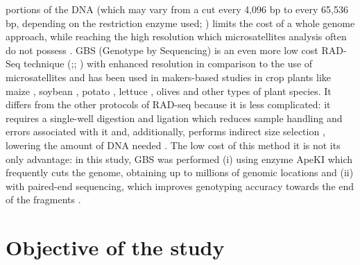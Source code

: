 \documentclass[a4paper, 12pt]{report}
\begin{document}
portions of the DNA (which may vary from a cut every 4,096 bp to every 65,536 bp, depending on the restriction enzyme used; \cite{andrewsHarnessingPowerRADseq2016}) limits the cost of a whole genome approach, while reaching the high resolution which microsatellites analysis often do not possess \parencite{suppleConservationBiodiversityGenomics2018}. GBS (Genotype by Sequencing) is an even more low cost RAD-Seq technique (\cite{elshireRobustSimpleGenotypingbySequencing2011};\cite{heGenotypingbysequencingGBSUltimate2014}; \cite{islamGeneticDiversityPopulation2021}) with enhanced resolution in comparison to the use of microsatellites \parencite{martinaConservationValorizationItalian2025} and has been used in makers-based studies in crop plants like maize \parencite{elshireRobustSimpleGenotypingbySequencing2011}, soybean \parencite{sonahImprovedGenotypingSequencing2013}, potato \parencite{martinaConservationValorizationItalian2025}, lettuce \parencite{heGenotypingbysequencingGBSUltimate2014}, olives \parencite{islamGeneticDiversityPopulation2021} and other types of plant species. It differs from the other protocols of RAD-seq because it is less complicated: it requires a single-well digestion and ligation which reduces sample handling and errors associated with it \parencite{heGenotypingbysequencingGBSUltimate2014} and, additionally, performs indirect size selection \parencite{elshireRobustSimpleGenotypingbySequencing2011}, lowering the amount of DNA needed \parencite{sonahImprovedGenotypingSequencing2013}. The low cost of this method it is not its only advantage: in this study, GBS was performed (i) using enzyme ApeKI which frequently cuts the genome, obtaining up to millions of genomic locations \parencite{elshireRobustSimpleGenotypingbySequencing2011} and (ii) with paired-end sequencing, which improves genotyping accuracy towards the end of the fragments  \parencite{andrewsHarnessingPowerRADseq2016}.

\section{Objective of the study}
\end{document}
